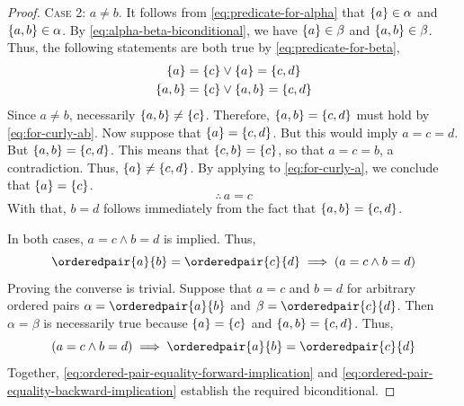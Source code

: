 \begin{proof}
    \vspace{0.5cm}
    \noindent
    {\scshape Case 2}: \( a \neq b \). It follows from \eqref{eq:predicate-for-alpha} that \( \mleft\{ a \mright\} \in \alpha \)
    and \( \mleft\{ a, b \mright\} \in \alpha \). By \eqref{eq:alpha-beta-biconditional}, we have \( \mleft\{ a \mright\} \in \beta \)
    and \( \mleft\{ a, b \mright\} \in \beta \). Thus, the following statements are both true by \eqref{eq:predicate-for-beta},
    \begin{gather}
        \mleft\{ a \mright\} = \mleft\{ c \mright\} \lor \mleft\{ a \mright\} = \mleft\{ c, d \mright\} \label{eq:for-curly-a}\\
        \mleft\{ a, b \mright\} = \mleft\{ c \mright\} \lor \mleft\{ a, b \mright\} = \mleft\{ c, d \mright\} \label{eq:for-curly-ab}
    \end{gather}
    Since \( a \neq b \), necessarily \( \mleft\{ a, b \mright\} \neq \mleft\{ c \mright\} \). Therefore, \( \mleft\{ a, b \mright\} = \mleft\{ c, d \mright\} \)
    must hold by \eqref{eq:for-curly-ab}. Now suppose that \( \mleft\{ a \mright\} = \mleft\{ c, d \mright\} \). But this would imply \( a = c = d \). But
    \( \mleft\{ a, b \mright\} = \mleft\{ c, d \mright\} \). This means that \( \mleft\{ c, b \mright\} = \mleft\{ c \mright\} \), so that \( a = c = b \),
    a contradiction. Thus, \( \mleft\{ a \mright\} \neq \mleft\{ c, d \mright\} \). By applying
     to \eqref{eq:for-curly-a}, we conclude that \( \mleft\{ a \mright\} = \mleft\{ c \mright\} \).
    \begin{equation*}
        \therefore \, a = c
    \end{equation*}
    With that, \( b = d \) follows immediately from the fact that \( \mleft\{ a, b \mright\} = \mleft\{ c, d\mright\} \).

    \vspace{0.5cm}
    \noindent
    In both cases, \( a = c \land b = d \) is implied. Thus,
    \begin{equation}
        \label{eq:ordered-pair-equality-forward-implication}
        \orderedpair{a}{b} = \orderedpair{c}{d} \implies \mleft( a = c \land b = d \mright)
    \end{equation}
    Proving the converse is trivial. Suppose that \( a = c \) and \( b = d \) for arbitrary ordered pairs \( \alpha = \orderedpair{a}{b} \)
    and \( \beta = \orderedpair{c}{d} \). Then \( \alpha = \beta \) is necessarily true because \( \mleft\{ a \mright\} = \mleft\{ c \mright\} \)
    and \( \mleft\{ a, b \mright\} = \mleft\{ c, d \mright\} \). Thus,
    \begin{equation}
        \label{eq:ordered-pair-equality-backward-implication}
        \mleft( a = c \land b = d \mright) \implies \orderedpair{a}{b} = \orderedpair{c}{d}
    \end{equation}
    Together, \eqref{eq:ordered-pair-equality-forward-implication} and \eqref{eq:ordered-pair-equality-backward-implication} establish
    the required biconditional.
\end{proof}

